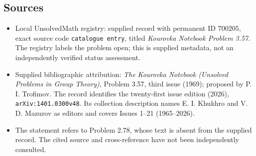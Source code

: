 \documentclass[11pt]{article}
\begin{document}
\subsection{Sources}
\begin{itemize}
\item Local UnsolvedMath registry: supplied record with permanent ID \(700205\), exact source code \texttt{catalogue entry}, titled \emph{Kourovka Notebook Problem 3.57}. The registry labels the problem open; this is supplied metadata, not an independently verified status assessment.
\item Supplied bibliographic attribution: \emph{The Kourovka Notebook (Unsolved Problems in Group Theory)}, Problem 3.57, third issue (1969); proposed by P. I. Trofimov. The record identifies the twenty-first issue edition (2026), \texttt{arXiv:1401.0300v48}. Its collection description names E. I. Khukhro and V. D. Mazurov as editors and covers Issues 1--21 (1965--2026).
\item The statement refers to Problem 2.78, whose text is absent from the supplied record. The cited source and cross-reference have not been independently consulted.
\end{itemize}
\end{document}
